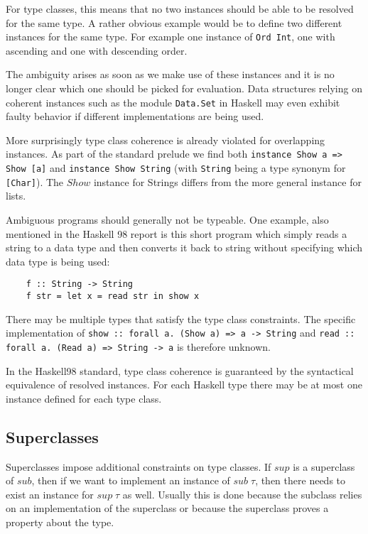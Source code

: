 For type classes, this means that no two instances should be able to be resolved for the same type.
A rather obvious example would be to define two different instances for the same type.
For example one instance of \texttt{Ord Int}, one with ascending and one with descending order.

The ambiguity arises as soon as we make use of these instances and it is no longer clear which one should be picked for evaluation.
Data structures relying on coherent instances such as the module \texttt{Data.Set} in Haskell may even exhibit faulty behavior if different implementations are being used. \cite{Kilpatrick2019-cy}

More surprisingly type class coherence is already violated for overlapping instances.
As part of the standard prelude we find both \texttt{instance Show a => Show [a]} and \texttt{instance Show String}
(with \texttt{String} being a type synonym for \texttt{[Char]}).
The $\mathit{Show}$ instance for Strings differs from the more general instance for lists.

Ambiguous programs should generally not be typeable.
One example, also mentioned in the Haskell 98 report \cite{Haskell98} is this short program which simply reads a string to a data type and then converts it back to string without specifying which data type is being used:

\begin{verbatim}
    f :: String -> String
    f str = let x = read str in show x
\end{verbatim}

There may be multiple types that satisfy the type class constraints.
The specific implementation of \texttt{show :: forall a. (Show a) => a -> String} and \texttt{read :: forall a. (Read a) => String -> a} is therefore unknown.

In the Haskell98 standard, type class coherence is guaranteed by the syntactical equivalence of resolved instances.
For each Haskell type there may be at most one instance defined for each type class.


\subsection{Superclasses}

Superclasses impose additional constraints on type classes.
If $sup$ is a superclass of $sub$, then if we want to implement an instance of $sub \;\tau$, then there needs to exist an instance for $sup \;\tau$ as well.
Usually this is done because the subclass relies on an implementation of the superclass or because the superclass proves a property about the type.

